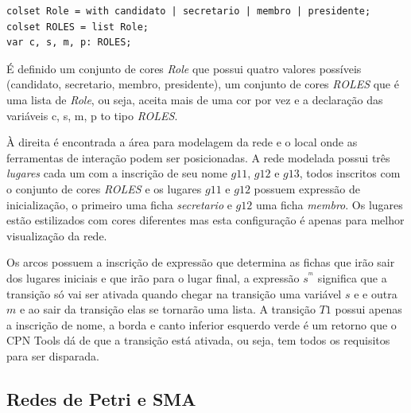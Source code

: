 \begin{lstlisting}
colset Role = with candidato | secretario | membro | presidente;
colset ROLES = list Role;
var c, s, m, p: ROLES;
\end{lstlisting}

É definido um conjunto de cores \textit{Role} que possui quatro valores possíveis (candidato, secretario, membro, presidente), um conjunto de cores \textit{ROLES} que é uma lista de \textit{Role}, ou seja, aceita mais de uma cor por vez e a declaração das variáveis c, s, m, p to tipo \textit{ROLES}.

À direita é encontrada a área para modelagem da rede e o local onde as ferramentas de interação podem ser posicionadas. A rede modelada possui três \textit{lugares} cada um com a inscrição de seu nome $g11$, $g12$ e $g13$, todos  inscritos com o conjunto de cores \textit{ROLES} e os lugares $g11$ e $g12$ possuem expressão de inicialização, o primeiro uma ficha \textit{secretario} e $g12$ uma ficha \textit{membro}. Os lugares estão estilizados com cores diferentes mas esta configuração é apenas para melhor visualização da rede.

Os arcos possuem a inscrição de expressão que determina as fichas que irão sair dos lugares iniciais e que irão para o lugar final, a expressão $s^^m$ significa que a transição só vai ser ativada quando chegar na transição uma variável $s$ e e outra $m$ e ao sair da transição elas se tornarão uma lista. A transição $T1$ possui apenas a inscrição de nome, a borda e canto inferior esquerdo verde é um retorno que o CPN Tools dá de que a transição está ativada, ou seja, tem todos os requisitos para ser disparada.

\subsection{Redes de Petri e SMA}

